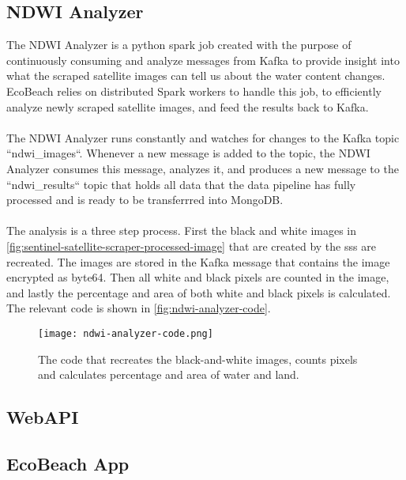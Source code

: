 \subsection{NDWI Analyzer}\label{subsec:ndwi-analyzer}

The NDWI Analyzer is a python spark job created with the purpose of continuously consuming and analyze messages from Kafka to provide insight into what the scraped satellite images can tell us about the water content changes. EcoBeach relies on distributed Spark workers to handle this job, to efficiently analyze newly scraped satellite images, and feed the results back to Kafka.\\\\
\noindent
The NDWI Analyzer runs constantly and watches for changes to the Kafka topic ``ndwi\_images``. Whenever a new message is added to the topic, the NDWI Analyzer consumes this message, analyzes it, and produces a new message to the ``ndwi\_results`` topic that holds all data that the data pipeline has fully processed and is ready to be transferrred into MongoDB.\\\\
\noindent
The analysis is a three step process. First the black and white images in \autoref{fig:sentinel-satellite-scraper-processed-image} that are created by the \acrshort{sss} are recreated. The images are stored in the Kafka message that contains the image encrypted as byte64. Then all white and black pixels are counted in the image, and lastly the percentage and area of both white and black pixels is calculated. The relevant code is shown in \autoref{fig:ndwi-analyzer-code}.

\begin{figure}[h!]
    \centering
    \texttt{[image: ndwi-analyzer-code.png]}
    \caption{The code that recreates the black-and-white images, counts pixels and calculates percentage and area of water and land.}
    \label{fig:ndwi-analyzer-code}
\end{figure}

\subsection{WebAPI}

\subsection{EcoBeach App}\label{subsec:ecobeach-app}





